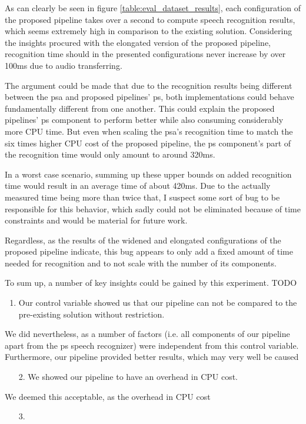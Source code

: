 { %
As can clearly be seen in figure \ref{table:eval_dataset_results}, each configuration of the proposed pipeline takes over a second to compute speech recognition results, which seems extremely high in comparison to the existing solution.
Considering the insights procured with the elongated version of the proposed pipeline, recognition time should in the presented configurations never increase by over 100ms due to audio transferring.

The argument could be made that due to the recognition results being different between the \gls{psa} and proposed pipelines' \gls{ps}, both implementations could behave fundamentally different from one another.
This could explain the proposed pipelines' \gls{ps} component to perform better while also consuming considerably more CPU time.
But even when scaling the \gls{psa}'s recognition time to match the six times higher CPU cost of the proposed pipeline, the \gls{ps} component's part of the recognition time would only amount to around 320ms.

In a worst case scenario, summing up these upper bounds on added recognition time would result in an average time of about 420ms.  
Due to the actually measured time being more than twice that, I suspect some sort of bug to be responsible for this behavior, which sadly could not be eliminated because of time constraints and would be material for future work.

Regardless, as the results of the widened and elongated configurations of the proposed pipeline indicate, this bug appears to only add a fixed amount of time needed for recognition and to not scale with the number of its components. 
}

To sum up, a number of key insights could be gained by this experiment.
TODO
\begin{enumerate}
	\item Our control variable showed us that our pipeline can not be compared to the pre-existing solution without restriction.
\end{enumerate}
We did nevertheless, as a number of factors (i.e. all components of our pipeline apart from the \gls{ps} speech recognizer) were independent from this control variable.
Furthermore, our pipeline provided better results, which may very well be caused 


\begin{enumerate}
	\item[2.] We showed our pipeline to have an overhead in CPU cost.
\end{enumerate}
We deemed this acceptable, as the overhead in CPU cost 

\begin{enumerate}
	\item[3.] 
\end{enumerate}




